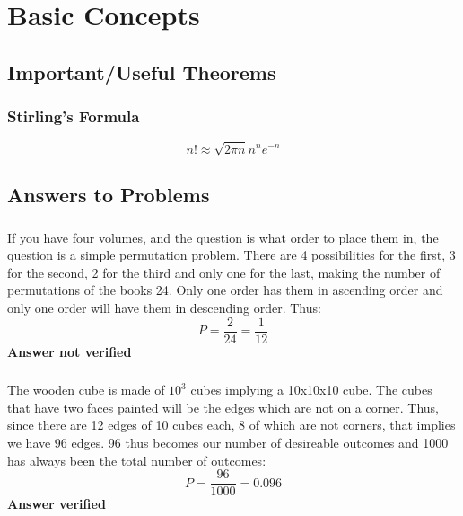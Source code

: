 
\chapter{Basic Concepts}
\section{Important/Useful Theorems}
\subsection{Stirling's Formula}
\begin{equation}
	n! \approx \sqrt{2 \pi n} n^n e^{-n}
\end{equation}
\section{Answers to Problems}

%
%
%	

\subsection{}
If you have four volumes, and the question is what order to place them in, the question is a simple permutation problem.  There are 4 possibilities for the first, 3 for the second, 2 for the third and only one for the last, making the number of permutations of the books 24.  Only one order has them in ascending order and only one order will have them in descending order.  Thus:
\begin{equation}
	P=\frac{2}{24}=\frac{1}{12}
\label{answer1.1}
\end{equation}
\textbf{Answer not verified}

\subsection{}
The wooden cube is made of $10^3$ cubes implying a 10x10x10 cube.  The cubes that have two faces painted will be the edges which are not on a corner.  Thus, since there are 12 edges of 10 cubes each, 8 of which are not corners, that implies we have 96 edges.  96 thus becomes our number of desireable outcomes and 1000 has always been the total number of outcomes:
\begin{equation}
	P=\frac{96}{1000} = 0.096
\label{answer1.2}
\end{equation}
\textbf{Answer verified}


